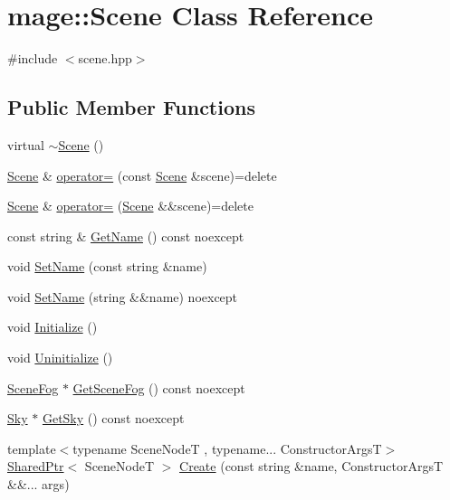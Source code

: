 \hypertarget{classmage_1_1_scene}{}\section{mage\+:\+:Scene Class Reference}
\label{classmage_1_1_scene}


{\ttfamily \#include $<$scene.\+hpp$>$}

\subsection*{Public Member Functions}
\begin{DoxyCompactItemize}
\item 
virtual \hyperlink{classmage_1_1_scene_adc40910fdca62586659c2961fe7e7f3c}{$\sim$\+Scene} ()
\item 
\hyperlink{classmage_1_1_scene}{Scene} \& \hyperlink{classmage_1_1_scene_a2c25c0fedc0230771d8c00a8288a69ce}{operator=} (const \hyperlink{classmage_1_1_scene}{Scene} \&scene)=delete
\item 
\hyperlink{classmage_1_1_scene}{Scene} \& \hyperlink{classmage_1_1_scene_a400926762670c9cd9b6d456291600f53}{operator=} (\hyperlink{classmage_1_1_scene}{Scene} \&\&scene)=delete
\item 
const string \& \hyperlink{classmage_1_1_scene_a6afd25c30d08eb579eb430af49cf8fc0}{Get\+Name} () const noexcept
\item 
void \hyperlink{classmage_1_1_scene_a9b7c1c2f84cc3b3c5ff3de4f29d830e9}{Set\+Name} (const string \&name)
\item 
void \hyperlink{classmage_1_1_scene_a86b2e6e764ee134af1706f90603a6596}{Set\+Name} (string \&\&name) noexcept
\item 
void \hyperlink{classmage_1_1_scene_a3cd12ef381ca743bf0b8f8aa2a76eb57}{Initialize} ()
\item 
void \hyperlink{classmage_1_1_scene_a714dc33c04dc2b8e2cec93564905b174}{Uninitialize} ()
\item 
\hyperlink{structmage_1_1_scene_fog}{Scene\+Fog} $\ast$ \hyperlink{classmage_1_1_scene_a1f21d92feb659477ceb4642322fa2f0c}{Get\+Scene\+Fog} () const noexcept
\item 
\hyperlink{structmage_1_1_sky}{Sky} $\ast$ \hyperlink{classmage_1_1_scene_afecf68ec8c48d4c28082f99d8042e700}{Get\+Sky} () const noexcept
\item 
{\footnotesize template$<$typename Scene\+NodeT , typename... Constructor\+ArgsT$>$ }\\\hyperlink{namespacemage_a1e01ae66713838a7a67d30e44c67703e}{Shared\+Ptr}$<$ Scene\+NodeT $>$ \hyperlink{classmage_1_1_scene_abfce90d15a9aa5b5e05709b35286de88}{Create} (const string \&name, Constructor\+ArgsT \&\&... args)

\end{DoxyCompactItemize}
